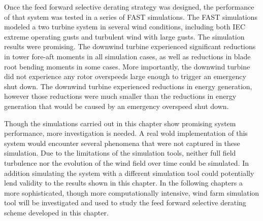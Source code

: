 Once the feed forward selective derating strategy was designed, the performance of that system was tested in a series of FAST simulations. The FAST simulations modeled a two turbine system in several wind conditions, including both  IEC extreme operating gusts and turbulent wind with large gusts. The simulation results were promising. The downwind turbine experienced significant reductions in tower fore-aft moments in all simulation cases, as well as reductions in blade root bending moments in some cases. More importantly, the downwind turbine did not experience any rotor overspeeds large enough to trigger an emergency shut down. The downwind turbine experienced reductions in energy generation, however those reductions were much smaller than the reductions in energy generation that would be caused by an emergency overspeed shut down.

Though the simulations carried out in this chapter show promising system performance, more investigation is needed. A real wold implementation of this system would encounter several phenomena that were not captured in these simulation. Due to the limitations of the simulation tools, neither full field turbulence nor the evolution of the wind field over time could be simulated. In addition simulating the system with a different simulation tool could potentially lend validity to the results shown in this chapter. In the following chapters a more sophisticated, though more computationally intensive, wind farm simulation tool will be investigated and used to study the feed forward selective derating scheme developed in this chapter.
